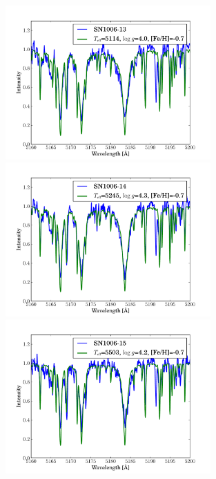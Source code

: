 \begin{figure}[htbp]
   \label{fig:sn1006_candfit}
\end{figure}\begin{figure}[htbp] %
   \centering
\includegraphics[width=0.7\textwidth, trim=0 0mm 0 10mm, clip]{chapter_sn1006/plots/gold_spectra/sn1006_13.pdf}
\includegraphics[width=0.7\textwidth, trim=0 0mm 0 10mm, clip]{chapter_sn1006/plots/gold_spectra/sn1006_14.pdf}
\includegraphics[width=0.7\textwidth, trim=0 0mm 0 10mm, clip]{chapter_sn1006/plots/gold_spectra/sn1006_15.pdf}


\end{figure}
